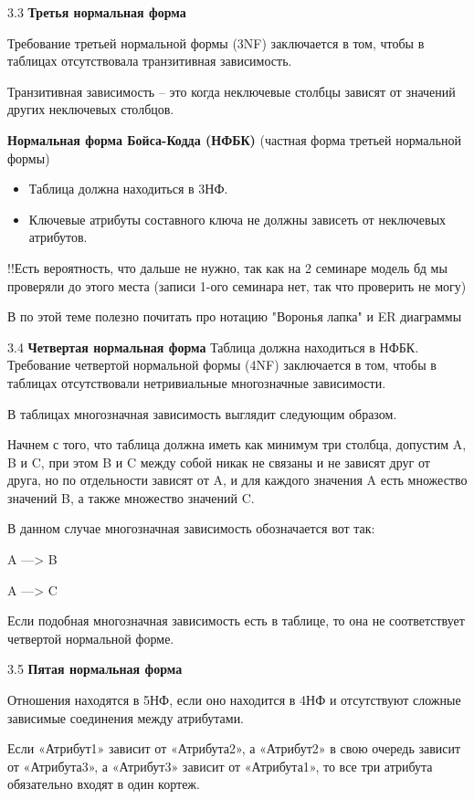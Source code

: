 3.3 \textbf{Третья нормальная форма}

Требование третьей нормальной формы (3NF) заключается в том, чтобы в таблицах отсутствовала транзитивная зависимость.

Транзитивная зависимость – это когда неключевые столбцы зависят от значений других неключевых столбцов.

\textbf{Нормальная форма Бойса-Кодда (НФБК)} (частная форма третьей нормальной формы)

\begin{itemize}
	\item Таблица должна находиться в 3НФ. 
	\item Ключевые атрибуты составного ключа не должны зависеть от неключевых атрибутов.
\end{itemize}

\color{blue} !!Есть вероятность, что дальше не нужно, так как на 2 семинаре модель бд мы проверяли до этого места (записи 1-ого семинара нет, так что проверить не могу)

В по этой теме полезно почитать про нотацию "Воронья лапка" и ER диаграммы
\color{black} 

3.4 \textbf{Четвертая нормальная форма}
Таблица должна находиться в НФБК.
Требование четвертой нормальной формы (4NF) заключается в том, чтобы в таблицах отсутствовали нетривиальные многозначные зависимости.

В таблицах многозначная зависимость выглядит следующим образом.

Начнем с того, что таблица должна иметь как минимум три столбца, допустим A, B и C, при этом B и C между собой никак не связаны и не зависят друг от друга, но по отдельности зависят от A, и для каждого значения A есть множество значений B, а также множество значений C.

В данном случае многозначная зависимость обозначается вот так:

A —> B

A —> C

Если подобная многозначная зависимость есть в таблице, то она не соответствует четвертой нормальной форме.

3.5 \textbf{Пятая нормальная форма}

Отношения находятся в 5НФ, если оно находится в 4НФ и отсутствуют сложные зависимые соединения между атрибутами.

Если «Атрибут1» зависит от «Атрибута2», а «Атрибут2» в свою очередь зависит от «Атрибута3», а «Атрибут3» зависит от «Атрибута1», то все три атрибута обязательно входят в один кортеж.


